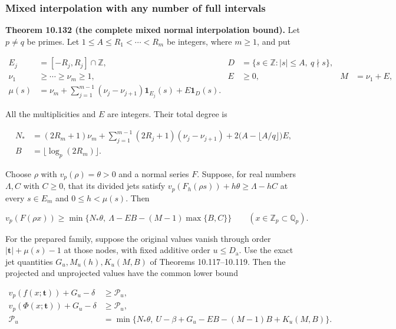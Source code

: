 \documentclass[
  11pt,
  a4paper,
]{article}
\begin{document}
\subsubsection{Mixed interpolation with any number of full
intervals}\label{mixed-interpolation-with-any-number-of-full-intervals}

\textbf{Theorem 10.132 (the complete mixed normal interpolation bound).}
Let \(p\ne q\) be primes. Let \(1\le A\le R_1<\cdots<R_m\) be integers,
where \(m\ge1\), and put

\[
\begin{aligned}
E_j&=[-R_j,R_j]\cap\mathbb Z,&
D&=\{s\in\mathbb Z:|s|\le A,\ q\nmid s\},\\
\nu_1&\ge\cdots\ge\nu_m\ge1,&
E&\ge0,& M&=\nu_1+E,\\
\mu(s)&=\nu_m+
\sum_{j=1}^{m-1}(\nu_j-\nu_{j+1})\mathbf1_{E_j}(s)
+E\mathbf1_D(s).
\end{aligned}
\tag{10.349}
\]

All the multiplicities and \(E\) are integers. Their total degree is

\[
\begin{aligned}
N_*&=(2R_m+1)\nu_m+
\sum_{j=1}^{m-1}(2R_j+1)(\nu_j-\nu_{j+1})
+2\bigl(A-\lfloor A/q\rfloor\bigr)E,\\
B&=\lfloor\log_p(2R_m)\rfloor.
\end{aligned}
\tag{10.350}
\]

Choose \(\rho\) with \(v_p(\rho)=\theta>0\) and a normal series \(F\).
Suppose, for real numbers \(\Lambda,C\) with \(C\ge0\), that its divided
jets satisfy \(v_p(F_h(\rho s))+h\theta\ge\Lambda-hC\) at every
\(s\in E_m\) and \(0\le h<\mu(s)\). Then

\[
v_p(F(\rho x))\ge
\min\{N_*\theta,\ \Lambda-EB-(M-1)\max\{B,C\}\}
\qquad(x\in\mathbb Z_p\subset\mathbb Q_p).
\tag{10.351}
\]

For the prepared family, suppose the original values vanish through
order \(|\boldsymbol t|+\mu(s)-1\) at those nodes, with fixed additive
order \(u\le D_{\mathrm a}\). Use the exact jet quantities
\(G_u,M_u(h),K_u(M,B)\) of Theorems 10.117--10.119. Then the projected
and unprojected values have the common lower bound

\[
\begin{aligned}
v_p(f(x;\boldsymbol t))+G_u-\delta&\ge\mathcal P_u,\\
v_p(\Phi(x;\boldsymbol t))+G_u-\delta&\ge\mathcal P_u,\\
\mathcal P_u&=
\min\{N_*\theta,\ U-\beta+G_u-EB-(M-1)B+K_u(M,B)\}.
\end{aligned}
\tag{10.352}
\]
\end{document}
